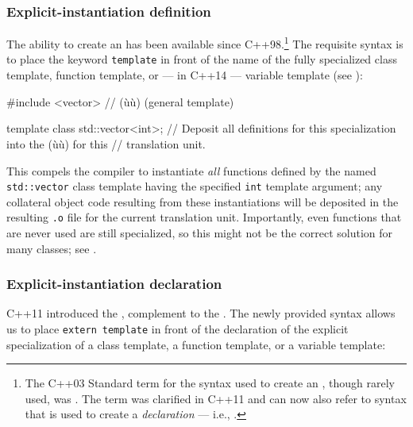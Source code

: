 \subsubsection[Explicit-instantiation definition]{Explicit-instantiation definition}\label{explicit-instantiation-definition}

The ability to create an  has been available since C++98.{\cprotect\footnote{The
  C++03 Standard term for the syntax used to create an
  , though rarely used,
  was . The term
   was clarified in
  C++11 and can now also refer to syntax that is used to create a
  \emph{declaration} --- i.e., .}} The requisite syntax is to place the keyword
\lstinline!template! in front of the name of the fully specialized class
template, function template, or --- in C++14 --- variable
template (see ):

\begin{emcppslisting}
#include <vector>  // (ù{}ù) (general template)

template class std::vector<int>;
    // Deposit all definitions for this specialization into the (ù{}ù) for this
    // translation unit.
\end{emcppslisting}

\noindent This  compels the compiler to
instantiate \emph{all} functions defined by the named
\lstinline!std::vector! class template having the specified \lstinline!int!
template argument; any collateral object code resulting from these
instantiations will be deposited in the resulting \lstinline!.o! file for
the current translation unit. Importantly, even functions that are never
used are still specialized, so this might not be the correct solution
for many classes; see .

\subsubsection[Explicit-instantiation declaration]{Explicit-instantiation declaration}\label{explicit-instantiation-declaration}

C++11 introduced the ,
complement to the . The
newly provided syntax allows us to place
\lstinline!extern!~\lstinline!template! in front of the declaration of the
explicit specialization of a class template, a function template, or a
variable template: %

